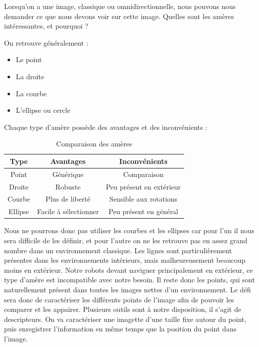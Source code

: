 
Lorsqu'on a une image, classique ou omnidirectionnelle, nous pouvons nous demander ce que nous devons voir sur cette image.
Quelles sont les amères intéressantes, et pourquoi ?

On retrouve généralement :
\begin{itemize}
\item Le point
\item La droite
\item La courbe
\item L'ellipse ou cercle
\end{itemize}
Chaque type d'amère possède des avantages et des inconvénients :
\begin{table}[h]
  \begin{center}
    \begin{tabular}{|c|c|c|}
      \hline
      Type & Avantages & Inconvénients \\
      \hline
      Point & Générique & Comparaison \\
      Droite & Robuste & Peu présent en extérieur \\
      Courbe & Plus de liberté & Sensible aux rotations \\
      Ellipse & Facile à sélectionner & Peu présent en général\\
      \hline
    \end{tabular}    		
  \end{center}
  \caption{Comparaison des amères}
\end{table}

Nous ne pourrons donc pas utiliser les courbes et les ellipses car pour l'un il nous sera difficile de les définir, et pour l'autre on ne les retrouve pas en assez grand nombre dans un environnement classique.
Les lignes sont particulièrement présentes dans les environnements intérieurs, mais malheureusement beaucoup moins en extérieur.
Notre robots devant naviguer principalement en extérieur, ce type d'amère est incompatible avec notre besoin.
Il reste donc les points, qui sont naturellement présent dans toutes les images nettes d'un environnement.
Le défi sera donc de caractériser les différents points de l'image afin de pouvoir les comparer et les appairer.
Plusieurs outils sont à notre disposition, il s'agit de descripteurs.
On va caractériser une imagette d'une taille fixe autour du point, puis enregistrer l'information en même temps que la position du point dans l'image.

